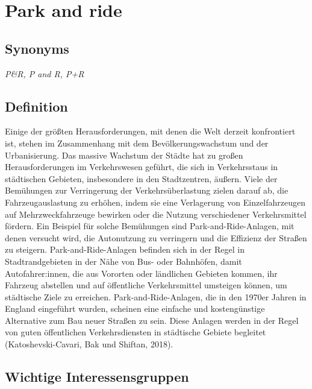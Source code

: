 \documentclass[
]{book}
\begin{document}
\hypertarget{p_r}{%
\section{Park and ride}\label{p_r}}

\hypertarget{synonyms-1}{%
\subsection*{Synonyms}\label{synonyms-1}}

\emph{P\&R, P and R, P+R}

\hypertarget{definition-25}{%
\subsection*{Definition}\label{definition-25}}

Einige der größten Herausforderungen, mit denen die Welt derzeit konfrontiert ist, stehen im Zusammenhang mit dem Bevölkerungswachstum und der Urbanisierung. Das massive Wachstum der Städte hat zu großen Herausforderungen im Verkehrswesen geführt, die sich in Verkehrsstaus in städtischen Gebieten, insbesondere in den Stadtzentren, äußern. Viele der Bemühungen zur Verringerung der Verkehrsüberlastung zielen darauf ab, die Fahrzeugauslastung zu erhöhen, indem sie eine Verlagerung von Einzelfahrzeugen auf Mehrzweckfahrzeuge bewirken oder die Nutzung verschiedener Verkehrsmittel fördern. Ein Beispiel für solche Bemühungen sind Park-and-Ride-Anlagen, mit denen versucht wird, die Autonutzung zu verringern und die Effizienz der Straßen zu steigern.
Park-and-Ride-Anlagen befinden sich in der Regel in Stadtrandgebieten in der Nähe von Bus- oder Bahnhöfen, damit Autofahrer:innen, die aus Vororten oder ländlichen Gebieten kommen, ihr Fahrzeug abstellen und auf öffentliche Verkehrsmittel umsteigen können, um städtische Ziele zu erreichen. Park-and-Ride-Anlagen, die in den 1970er Jahren in England eingeführt wurden, scheinen eine einfache und kostengünstige Alternative zum Bau neuer Straßen zu sein. Diese Anlagen werden in der Regel von guten öffentlichen Verkehrsdiensten in städtische Gebiete begleitet (Katoshevski-Cavari, Bak und Shiftan, 2018).

\hypertarget{wichtige-interessensgruppen-25}{%
\subsection*{Wichtige Interessensgruppen}\label{wichtige-interessensgruppen-25}}
\end{document}
